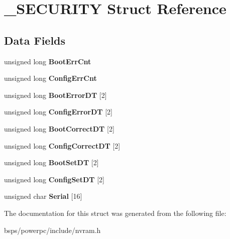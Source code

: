 \hypertarget{struct__SECURITY}{}\section{\+\_\+\+S\+E\+C\+U\+R\+I\+TY Struct Reference}
\label{struct__SECURITY}
\subsection*{Data Fields}
\begin{DoxyCompactItemize}
\item 
\mbox{\label{struct__SECURITY_a5b2ce438484ed1e334a9ac88d1b5edc5}} 
unsigned long {\bfseries Boot\+Err\+Cnt}
\item 
\mbox{\label{struct__SECURITY_a0903af5263d4cb6c48b3ae0c4c26f425}} 
unsigned long {\bfseries Config\+Err\+Cnt}
\item 
\mbox{\label{struct__SECURITY_ac7d7f54192959fc64c2439f62b76eb5a}} 
unsigned long {\bfseries Boot\+Error\+DT} \mbox{[}2\mbox{]}
\item 
\mbox{\label{struct__SECURITY_a6a3bc4111e5e2fedbd5bc77f6185e510}} 
unsigned long {\bfseries Config\+Error\+DT} \mbox{[}2\mbox{]}
\item 
\mbox{\label{struct__SECURITY_a4bbfd527e0a889c74990e21c9a6abf6e}} 
unsigned long {\bfseries Boot\+Correct\+DT} \mbox{[}2\mbox{]}
\item 
\mbox{\label{struct__SECURITY_aa63f2e7f1322df74255a33798bf7563a}} 
unsigned long {\bfseries Config\+Correct\+DT} \mbox{[}2\mbox{]}
\item 
\mbox{\label{struct__SECURITY_a4519ca3b7d04f19f266a7e4bbdc3340a}} 
unsigned long {\bfseries Boot\+Set\+DT} \mbox{[}2\mbox{]}
\item 
\mbox{\label{struct__SECURITY_a682ade26aabf0bce8f10786e4be85fa7}} 
unsigned long {\bfseries Config\+Set\+DT} \mbox{[}2\mbox{]}
\item 
\mbox{\label{struct__SECURITY_a6b47c8ea30a8d47624b48b8873b727b5}} 
unsigned char {\bfseries Serial} \mbox{[}16\mbox{]}
\end{DoxyCompactItemize}


The documentation for this struct was generated from the following file\+:\begin{DoxyCompactItemize}
\item 
bsps/powerpc/include/nvram.\+h\end{DoxyCompactItemize}

